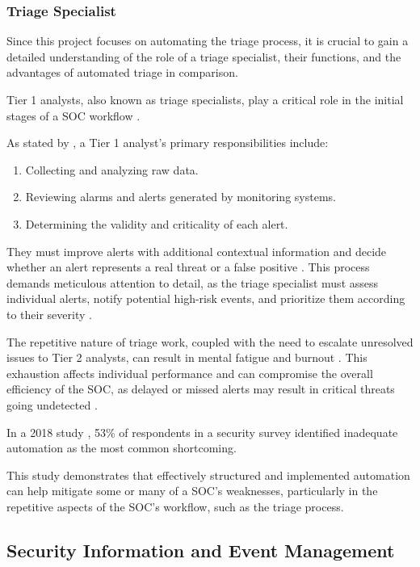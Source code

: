\subsubsection{Triage Specialist}

Since this project focuses on automating the triage process, it is crucial to gain a detailed understanding of the role of a triage specialist, their functions, and the advantages of automated triage in comparison.

Tier 1 analysts, also known as triage specialists, play a critical role in the initial stages of a \gls{SOC} workflow \parencite{Vielberth2020}. 

As stated by \textcite{Vielberth2020}, a Tier 1 analyst's primary responsibilities include:
\begin{enumerate}
    \item Collecting and analyzing raw data.
    \item Reviewing alarms and alerts generated by monitoring systems.
    \item Determining the validity and criticality of each alert.
\end{enumerate}

They must improve alerts with additional contextual information and decide whether an alert represents a real threat or a false positive \parencite{Hamornik2018, Sundaramurthy2014}. This process demands meticulous attention to detail, as the triage specialist must assess individual alerts, notify potential high-risk events, and prioritize them according to their severity \parencite{Tao2018}. 

The repetitive nature of triage work, coupled with the need to escalate unresolved issues to Tier 2 analysts, can result in mental fatigue and burnout \parencite{Tines2023, Iamnitchi2017}. This exhaustion affects individual performance and can compromise the overall efficiency of the \gls{SOC}, as delayed or missed alerts may result in critical threats going undetected \parencite{CriticalStart2019}.

In a 2018 study \parencite{Crowley2018}, 53\% of respondents in a security survey identified inadequate automation as the most common shortcoming.

This study demonstrates that effectively structured and implemented automation can help mitigate some or many of a \gls{SOC}'s weaknesses, particularly in the repetitive aspects of the \gls{SOC}'s workflow, such as the triage process.

\subsection{Security Information and Event Management}

